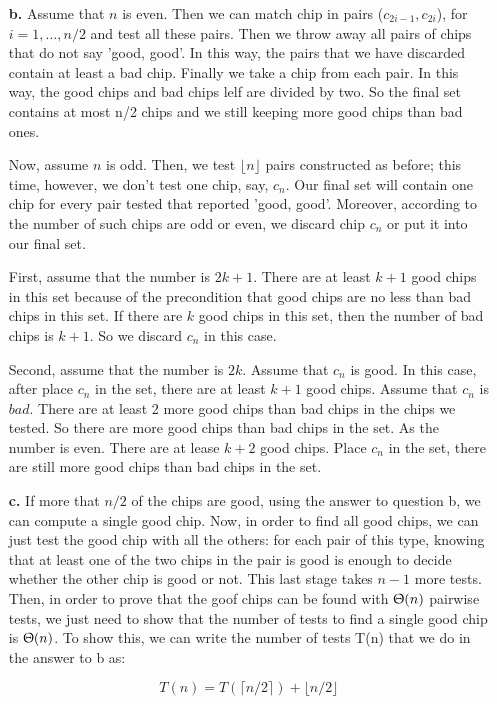 \documentclass{book}
\begin{document}
\begin{CJK}{UTF8}{gkai}
\begin{flushleft}
\begin{itemize}
\item[\textbf{b.}] Assume that $n$ is even. Then we can match chip in pairs 
($c_{2i-1}, c_{2i}$), for $i = 1, \dots, n/2$ and test all these pairs. Then we 
throw away all pairs of chips that do not say 'good, good'. In this way, the 
pairs that we have discarded contain at least a bad chip.  Finally we take a 
chip from each pair. In this way, the good chips and bad chips lelf are divided 
by two. So the final set contains at most n/2 chips and we still keeping more 
good chips than bad ones. 

Now, assume $n$ is odd. Then, we test $\lfloor n \rfloor$ pairs constructed as 
before; this time, however, we don't test one chip, say, $c_n$. Our final set 
will contain one chip for every pair tested that reported 'good, good'.  
Moreover, according to the number of such chips are odd or even, we discard chip 
$c_n$ or put it into our final set.

First, assume that the number is $2k+1$. There are at least $k+1$ good chips in 
this set because of the precondition that good chips are no less than bad chips 
in this set.  If there are $k$ good chips in this set, then the number of bad 
chips is $k+1$. So we discard $c_n$ in this case.

Second, assume that the number is $2k$. Assume that $c_n$ is good. In this case, 
after place $c_n$ in the set, there are at least $k+1$ good chips. Assume that 
$c_n$ is $bad$. There are at least 2 more good chips than bad chips in the chips 
we tested. So there are more good chips than bad chips in the set. As the number 
is even. There are at lease $k+2$ good chips. Place $c_n$ in the set, there are 
still more good chips than bad chips in the set.

\item[\textbf{c.}] If more that $n/2$ of the chips are good, using the answer to 
question b, we can compute a single good chip. Now, in order to find all good 
chips, we can just test the good chip with all the others: for each pair of this 
type, knowing that at least one of the two chips in the pair is good is enough 
to decide whether the other chip is good or not.  This last stage takes $n-1$ 
more tests. Then, in order to prove that the goof chips can be found with 
$\Uptheta(n)$ pairwise tests, we just need to show that the number of tests to 
find a single good chip is $\Uptheta(n)$. To show this, we can write the number 
of tests T(n) that we do in the answer to b as:

\begin{equation}
T(n) = T(\lceil n/2 \rceil) + \lfloor n/2 \rfloor \label{clever}
\end{equation}


\end{itemize}
\end{flushleft}
\end{CJK}
\end{document}
